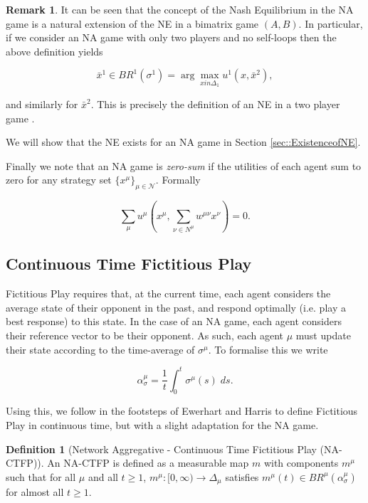 \documentclass{article}
\theoremstyle{definition}
\newtheorem{definition}{Definition}
\newtheorem*{remark}{Remark}
\newcommand{\agentset}{\mathcal{N}}
\newcommand{\wmunu}{w^{\mu \nu}}
\newcommand{\xmu}{x^{\mu}}
\newcommand{\xnu}{x^{\nu}}
\newcommand{\refmu}{\sigma^{\mu}}
\newcommand{\avgref}[1]{\alpha_\sigma^{#1}}
\newcommand{\NE}[1]{\bar{x}^{#1}}
\newcommand{\weightedsum}{ \sum_{\nu \in N^\mu} \wmunu \xnu}
\begin{document}
  \begin{remark}
    It can be seen that the concept of the Nash Equilibrium in the NA game is a natural
    extension of the NE in a bimatrix game $(A, B)$. In particular, if we consider an NA game
    with only two players and no self-loops then the above definition yields

    \begin{equation*}
      \NE{1} \in BR^1 (\sigma^1) = \arg \max_{x in \Delta_1} u^1 (x, \NE{2}), 
    \end{equation*}

    and similarly for $\NE{2}$. This is precisely the definition of an NE in a two player game \cite{}.
  \end{remark}

  We will show that the NE exists for an NA game in Section \ref{sec::ExistenceofNE}. 

  Finally we note that an NA game is \emph{zero-sum} if the utilities of each agent sum to zero for any strategy set $\{ \xmu \}_{\mu \in \agentset}$. Formally

  \begin{equation}
    \sum_\mu u^\mu(\xmu, \weightedsum) = 0.
  \end{equation}

\subsection{Continuous Time Fictitious Play}
\label{sec::CTFP}

  Fictitious Play requires that, at the current time, each agent considers the average state
  of their opponent in the past, and respond optimally (i.e. play a best response) to this state. In the case of an NA game, each agent considers their reference vector to be their
  opponent. As such, each agent $\mu$ must update their state according to the time-average of
  $\refmu$. To formalise this we write

  \begin{equation}
    \avgref{\mu} = \frac{1}{t} \int_0^t \refmu(s) \; ds.
  \end{equation}

  Using this, we follow in the footsteps of Ewerhart \cite{} and Harris \cite{} to define
  Fictitious Play in continuous time, but with a slight adaptation for the NA game.
%
  \begin{definition}[Network Aggregative - Continuous Time Fictitious Play (NA-CTFP)]
    An NA-CTFP is defined as a measurable map $m$ with components $m^\mu$ such that for all $\mu$
    and all $t \geq 1$, $m^\mu: [0, \infty) \rightarrow \Delta_\mu$ satisfies $m^\mu(t) \in
    BR^\mu(\alpha_{\sigma}^\mu)$ for almost all $t \geq 1$.
  \end{definition}
\end{document}
